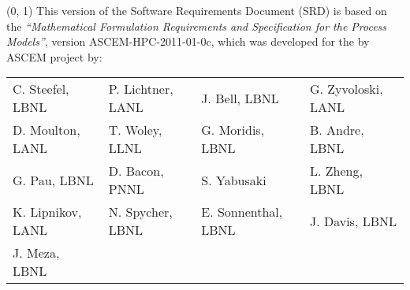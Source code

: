 %
%  
%



\DocDate{\today}



\AMANZIcover

\begin{textblock}{12}(0, 1)
This version of the Software Requirements Document (SRD) is based on the
\emph{``Mathematical Formulation Requirements and Specification for the Process Models''},
version ASCEM-HPC-2011-01-0c, which was developed for the by ASCEM project by: \\

\begin{tabular}{llll}
  C. Steefel, LBNL &
  P. Lichtner, LANL & 
  J. Bell, LBNL &
  G. Zyvoloski, LANL
  \\[-3pt]
  D. Moulton, LANL & 
  T. Woley, LLNL &
  G. Moridis, LBNL &
  B. Andre, LBNL 
  \\[-3pt]
  G. Pau, LBNL &
  D. Bacon, PNNL &
  S. Yabusaki &
  L. Zheng, LBNL
  \\[-3pt]
  K. Lipnikov, LANL &
  N. Spycher, LBNL &
  E. Sonnenthal, LBNL &
  J. Davis, LBNL
  \\[-3pt]
  J. Meza, LBNL & & & \\
\end{tabular}
\end{textblock}

\AMANZIdisclaimer

